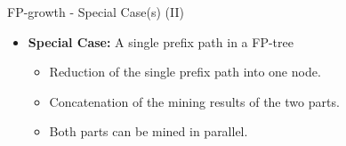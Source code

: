 \begin{frame}{FP-growth - Special Case(s) (II)}
	\begin{itemize}
		\item \textbf{Special Case:} A single prefix path in a FP-tree
		      \begin{itemize}
			      \item Reduction of the single prefix path into one node.
			      \item Concatenation of the mining results of the two parts.
			      \item Both parts can be mined in parallel.
		      \end{itemize}
	\end{itemize}

	\vspace*{0.5cm}


\end{frame}
